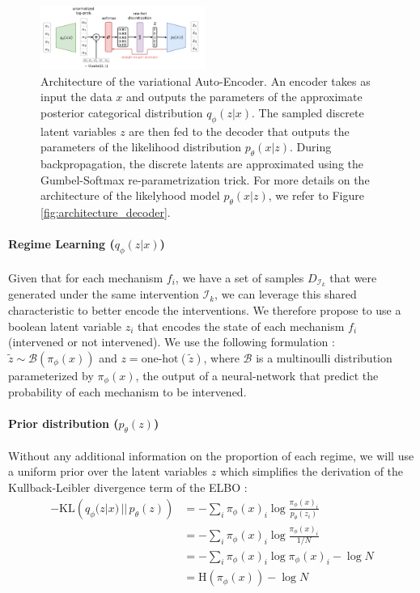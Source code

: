 \documentclass{article}
\begin{document}
\begin{figure}
    \centering
    \includegraphics[width=0.48\textwidth]{images/architecture.pdf}
    \caption{Architecture of the variational Auto-Encoder. An encoder takes as input the data $x$ and outputs the parameters of the approximate posterior categorical distribution $q_\phi(z | x)$. The sampled discrete latent variables $z$ are then fed to the decoder that outputs the parameters of the likelihood distribution $p_\theta(x | z)$. During backpropagation, the discrete latents are approximated using the Gumbel-Softmax re-parametrization trick. For more details on the architecture of the likelyhood model $p_\theta(x | z)$, we refer to Figure \ref{fig:architecture_decoder}.}
    \label{fig:architecture}
\end{figure}
\paragraph{Regime Learning ($q_\phi(z | x)$)}Given that for each mechanism $f_i$, we have a set of samples
$D_{\mathcal{I}_k}$ that were generated under the same intervention
$\mathcal{I}_k$, we can leverage this shared characteristic to better encode
the interventions. We therefore propose to use a boolean latent variable $z_i$
that encodes the state of each mechanism $f_i$ (intervened or not intervened).
We use the following formulation : $\tilde{z} \sim \mathcal{B}(\pi_\phi(x))$
and $z = \text{one-hot}(\tilde{z})$, where $\mathcal{B}$ is a multinoulli
distribution parameterized by $\pi_\phi(x)$, the output of a neural-network
that predict the probability of each mechanism to be intervened.
\paragraph{Prior distribution ($p_\theta(z)$)} Without any additional information on the proportion of each regime, we will
use a uniform prior over the latent variables $z$ which simplifies the
derivation of the Kullback-Leibler divergence term of the ELBO :
\begin{align*}
    -\text{KL}\left(q_\phi(z | x) \,||\, p_\theta(z)\right)
     & = - \sum_{i} \pi_\phi(x)_i \log \frac{\pi_\phi(x)_i}{p_\theta(z_i)} \\
     & = - \sum_{i} \pi_\phi(x)_i \log \frac{\pi_\phi(x)_i}{1/N}           \\
     & = - \sum_{i} \pi_\phi(x)_i \log \pi_\phi(x)_i - \log N              \\
     & = \text{H}(\pi_\phi(x)) - \log N
\end{align*}
\end{document}
